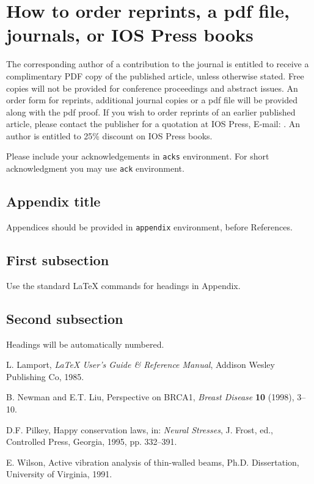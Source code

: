 \documentclass[ais]{iosart2x}
\begin{document}
\section{How to order reprints, a pdf file, journals, or IOS Press
books}
The corresponding author of a contribution to the journal is entitled to receive a complimentary PDF copy of the published article, unless otherwise stated.
Free copies will not be provided for conference proceedings and abstract issues. An order form for reprints,
additional journal copies or a pdf file will be provided along with the pdf proof.
If you wish to order reprints of an earlier published article, please contact the publisher for a quotation at IOS Press, E-mail: .
An author is entitled to 25\% discount on IOS Press books.


\begin{acks}
Please include your acknowledgements in \verb|acks| environment. For short acknowledgment you may use \verb|ack| environment.
\end{acks}

\begin{appendix}
\section{Appendix title}
Appendices should be provided in \verb|appendix| environment, before References.

\subsection{First subsection}
Use the standard \LaTeX{} commands for headings in Appendix.

\subsection{Second subsection}
Headings will be automatically numbered. 
\end{appendix}


\begin{thebibliography}{0}

 L. Lamport, \textit{\LaTeX{} User's Guide \& Reference Manual},
 Addison Wesley Publishing Co, 1985.

 B. Newman and E.T. Liu, Perspective on BRCA1, \textit{Breast Disease} \textbf{10} (1998), 3--10. 

 D.F. Pilkey, Happy conservation laws, in: \textit{Neural Stresses}, J. Frost, ed., Controlled Press, Georgia, 1995, pp. 332--391.

 E. Wilson, Active vibration analysis of thin-walled beams, Ph.D. Dissertation, University of Virginia, 1991.

\end{thebibliography}
\end{document}
